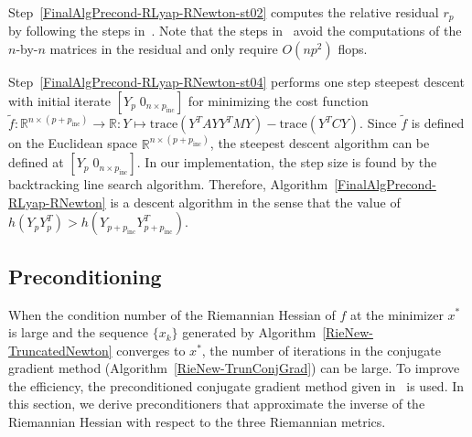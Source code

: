 \documentclass[11pt]{article}
\numberwithin{equation}{section}
\begin{document}
	Step~\ref{FinalAlgPrecond-RLyap-RNewton-st02} computes the relative residual $r_p$ by following the steps in~\cite{Bart10}. Note that the steps in~\cite{Bart10} avoid the computations of the $n$-by-$n$ matrices in the residual and only require $O(n p^2)$ flops.
	
	Step~\ref{FinalAlgPrecond-RLyap-RNewton-st04} performs one step steepest descent with initial iterate $[Y_p\; 0_{n\times p_{\mathrm{inc}}}]$ for minimizing the cost function $\tilde{f}: \mathbb{R}^{n \times (p + p_{\mathrm{inc}})} \rightarrow \mathbb{R}: Y \mapsto \mathrm{trace}(Y^TAYY^TMY) - \mathrm{trace}(Y^TCY)$. Since $\tilde{f}$ is defined on the Euclidean space $\mathbb{R}^{n \times (p + p_{\mathrm{inc}})}$, the steepest descent algorithm can be defined at $[Y_p\; 0_{n\times p_{\mathrm{inc}}}]$. In our implementation, the step size is found by the backtracking line search algorithm. Therefore, Algorithm~\ref{FinalAlgPrecond-RLyap-RNewton} is a descent algorithm in the sense that the value of $h(Y_p Y_p^T) > h(Y_{p+p_\mathrm{inc}} Y_{p+p_\mathrm{inc}}^T)$.


\subsection{Preconditioning} \label{sec:IncRankAlgPrecond:Precond}


When the condition number of the Riemannian Hessian of $f$ at the minimizer $x^*$ is large and the sequence $\{x_k\}$ generated by Algorithm~\ref{RieNew-TruncatedNewton} converges to $x^*$, the number of iterations in the conjugate gradient method (Algorithm~\ref{RieNew-TrunConjGrad}) can be large. To improve the efficiency, the preconditioned conjugate gradient method given in~\cite{NW06} is used. In this section, we derive preconditioners that approximate the inverse of the Riemannian Hessian with respect to the three Riemannian metrics. 
\end{document}
